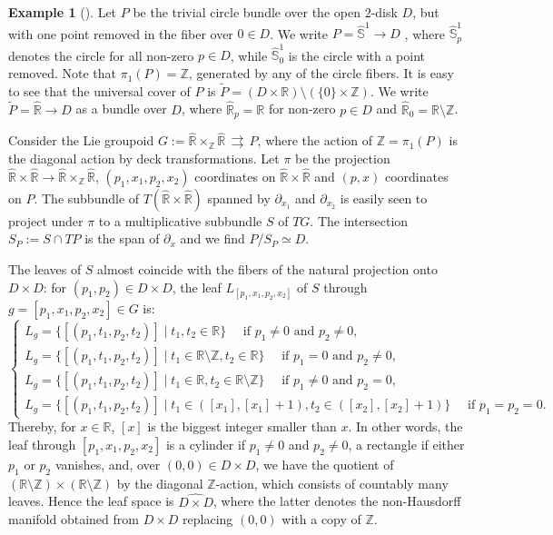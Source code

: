 \documentclass{amsart}
\theoremstyle{definition}
\newtheorem{example}[theorem]{Example}
\begin{document}
\begin{example}[\cite{Zambon10}]\label{example_of_marco}
Let $P$ be the trivial circle bundle over the open $2$-disk $D$, but with one
point removed in the fiber over $0 \in D$. We write $P= \hat{\mathbb{S}}^1\to D$ , where
$\hat{\mathbb{S}}^1_p$ denotes the circle for all non-zero $p \in D$, while 
$\hat{\mathbb{S}}^1_0$ is the circle with a point removed.
 Note that $\pi_1(P) = \mathbb Z$, generated by any of the circle fibers. It is easy to
see that the universal cover of $P$ is $\tilde P = (D \times {\mathbb{R}})\setminus(\{0\} \times \mathbb Z)$. 
We write $\tilde P = \hat {\mathbb{R}}\to D$ as a bundle over $D$, where $\hat{\mathbb{R}}_p ={\mathbb{R}}$ for non-zero $p \in D$
and $\hat {\mathbb{R}}_0 = {\mathbb{R}}\setminus\mathbb Z$.

Consider the Lie groupoid $G:=\hat{\mathbb{R}} \times_{\mathbb Z} \hat {\mathbb{R}}\,{{\rightrightarrows}}\, P$, where 
the action of $\mathbb Z=\pi_1(P)$ is the diagonal action by deck transformations.
Let $\pi$ be the projection $\hat{\mathbb{R}} \times\hat {\mathbb{R}} \to \hat{\mathbb{R}} \times_{\mathbb Z} \hat {\mathbb{R}}$, 
$(p_1,x_1,p_2,x_2)$ coordinates on $\hat{\mathbb{R}} \times \hat{\mathbb{R}}$ and $(p,x)$ coordinates on $P$. The subbundle 
of $T(\hat{\mathbb{R}} \times \hat{\mathbb{R}})$ spanned by $\partial_{x_1}$ and $\partial_{x_2}$
is easily seen to project under $\pi$ to a multiplicative subbundle $S$  of $TG$.
The intersection $S_P:=S\cap TP$ 
is the span of $\partial_x$ and we find $P/S_P\simeq D$.

The leaves of $S$ almost coincide with the
fibers of the natural projection onto $D \times D$: for $(p_1,p_2)\in D\times D$, the leaf $L_{[p_1,x_1,p_2,x_2]}$
of $S$ through $g=[p_1,x_1,p_2,x_2]\in G$ is:
\begin{equation*}
\left\{\begin{array}{l}
 L_{g}=\{[(p_1 ,t_1 , p_2 ,t_2 )] \mid t_1, t_2 \in {\mathbb{R}}\} 
\quad \text{  if }p_1\neq 0 \text{ and } p_2\neq 0,\\
 L_{g}=\{[(p_1 ,t_1 , p_2 ,t_2 )] \mid t_1\in{\mathbb{R}}\setminus\mathbb Z, t_2 \in {\mathbb{R}}\} 
\quad\text{  if }p_1=0 \text{ and } p_2\neq 0,\\
L_{g}=\{[(p_1 ,t_1 , p_2 ,t_2 )] \mid t_1\in {\mathbb{R}}, t_2 \in {\mathbb{R}}\setminus\mathbb Z\} 
\quad\text{  if }p_1\neq 0 \text{ and } p_2=0,\\
L_{g}=\{[(p_1 ,t_1 , p_2 ,t_2 )] \mid t_1\in ([x_1],[x_1]+1), t_2 \in ([x_2],[x_2]+1)\} 
\quad\text{  if }p_1=p_2=0.
\end{array}\right.
\end{equation*}
Thereby, for $x\in{\mathbb{R}}$, $[x]$ is the biggest integer smaller than $x$.
In other words, the leaf through $[p_1,x_1,p_2,x_2]$ is a cylinder
if $p_1\neq 0$  and  $p_2\neq 0$, a rectangle 
if either $p_1$ or $p_2$ vanishes, and, 
 over $(0, 0)\in D \times D$, we
have the quotient of $({\mathbb{R}} \setminus\mathbb Z) \times ({\mathbb{R}} \setminus \mathbb Z)$
 by the diagonal $\mathbb Z$-action, which consists of
countably many leaves. Hence the leaf space is $\widehat{D\times D}$,
where the latter denotes the non-Hausdorff manifold obtained from $D \times D$ replacing
$(0, 0)$ with a copy of $\mathbb Z$.


\end{example}
\end{document}
